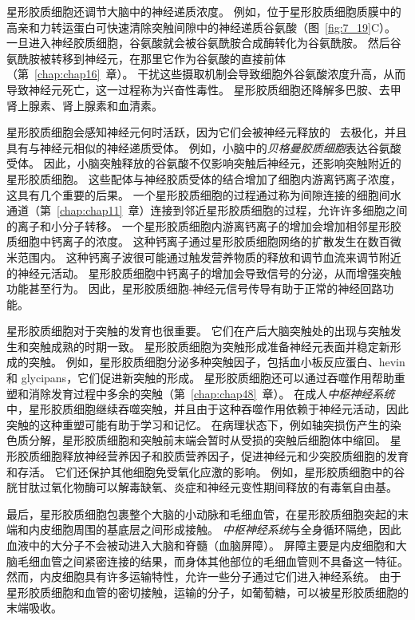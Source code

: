 星形胶质细胞还调节大脑中的神经递质浓度。
例如，位于星形胶质细胞质膜中的高亲和力转运蛋白可快速清除突触间隙中的神经递质谷氨酸（图~\ref{fig:7_19}C）。
一旦进入神经胶质细胞，谷氨酸就会被谷氨酰胺合成酶转化为谷氨酰胺。
然后谷氨酰胺被转移到神经元，在那里它作为谷氨酸的直接前体（第~\ref{chap:chap16}~章）。
干扰这些摄取机制会导致细胞外谷氨酸浓度升高，从而导致神经元死亡，这一过程称为兴奋性毒性。
星形胶质细胞还降解多巴胺、去甲肾上腺素、肾上腺素和血清素。


星形胶质细胞会感知神经元何时活跃，因为它们会被神经元释放的~ 去极化，并且具有与神经元相似的神经递质受体。
例如，小脑中的\textit{贝格曼胶质细胞}表达谷氨酸受体。
因此，小脑突触释放的谷氨酸不仅影响突触后神经元，还影响突触附近的星形胶质细胞。
这些配体与神经胶质受体的结合增加了细胞内游离钙离子浓度，这具有几个重要的后果。
一个星形胶质细胞的过程通过称为间隙连接的细胞间水通道（第~\ref{chap:chap11}~章）连接到邻近星形胶质细胞的过程，允许许多细胞之间的离子和小分子转移。 
一个星形胶质细胞内游离钙离子的增加会增加相邻星形胶质细胞中钙离子的浓度。
这种钙离子通过星形胶质细胞网络的扩散发生在数百微米范围内。
这种钙离子波很可能通过触发营养物质的释放和调节血流来调节附近的神经元活动。
星形胶质细胞中钙离子的增加会导致信号的分泌，从而增强突触功能甚至行为。
因此，星形胶质细胞-神经元信号传导有助于正常的神经回路功能。


星形胶质细胞对于突触的发育也很重要。
它们在产后大脑突触处的出现与突触发生和突触成熟的时期一致。
星形胶质细胞为突触形成准备神经元表面并稳定新形成的突触。
例如，星形胶质细胞分泌多种突触因子，包括血小板反应蛋白、hevin 和 glycipans，它们促进新突触的形成。
星形胶质细胞还可以通过吞噬作用帮助重塑和消除发育过程中多余的突触（第~\ref{chap:chap48}~章）。
在成人\textit{中枢神经系统}中，星形胶质细胞继续吞噬突触，并且由于这种吞噬作用依赖于神经元活动，因此突触的这种重塑可能有助于学习和记忆。
在病理状态下，例如轴突损伤产生的染色质分解，星形胶质细胞和突触前末端会暂时从受损的突触后细胞体中缩回。
星形胶质细胞释放神经营养因子和胶质营养因子，促进神经元和少突胶质细胞的发育和存活。
它们还保护其他细胞免受氧化应激的影响。
例如，星形胶质细胞中的谷胱甘肽过氧化物酶可以解毒缺氧、炎症和神经元变性期间释放的有毒氧自由基。


最后，星形胶质细胞包裹整个大脑的小动脉和毛细血管，在星形胶质细胞突起的末端和内皮细胞周围的基底层之间形成接触。
\textit{中枢神经系统}与全身循环隔绝，因此血液中的大分子不会被动进入大脑和脊髓（血脑屏障）。
屏障主要是内皮细胞和大脑毛细血管之间紧密连接的结果，而身体其他部位的毛细血管则不具备这一特征。
然而，内皮细胞具有许多运输特性，允许一些分子通过它们进入神经系统。
由于星形胶质细胞和血管的密切接触，运输的分子，如葡萄糖，可以被星形胶质细胞的末端吸收。



